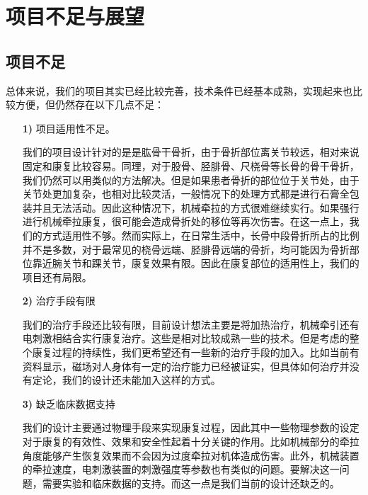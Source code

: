 \documentclass[UTF8]{ctexart}
\begin{document}
\section{项目不足与展望}
    \subsection{项目不足}
        总体来说，我们的项目其实已经比较完善，技术条件已经基本成熟，实现起来也比较方便，但仍然存在以下几点不足：
        \begin{enumerate}
            \item [\textbf{1)}]项目适用性不足。
            
            我们的项目设计针对的是是肱骨干骨折，由于骨折部位离关节较远，相对来说固定和康复比较容易。同理，对于股骨、胫腓骨、尺桡骨等长骨的骨干骨折，我们仍然可以用类似的方法解决。但是如果患者骨折的部位位于关节处，由于关节处更加复杂，也相对比较灵活，一般情况下的处理方式都是进行石膏全包装并且无法活动。因此这种情况下，机械牵拉的方式很难继续实行。如果强行进行机械牵拉康复，很可能会造成骨折处的移位等再次伤害。在这一点上，我们的方式适用性不够。然而实际上，在日常生活中，长骨中段骨折所占的比例并不是多数，对于最常见的桡骨远端、胫腓骨远端的骨折，均可能因为骨折部位靠近腕关节和踝关节，康复效果有限。因此在康复部位的适用性上，我们的项目还有局限。

            \item [\textbf{2)}]治疗手段有限
            
            我们的治疗手段还比较有限，目前设计想法主要是将加热治疗，机械牵引还有电刺激相结合实行康复治疗。这些是相对比较成熟一些的技术。但是考虑的整个康复过程的持续性，我们更希望还有一些新的治疗手段的加入。比如当前有资料显示，磁场对人身体有一定的治疗能力已经被证实，但具体如何治疗并没有定论，我们的设计还未能加入这样的方式。

            \item [\textbf{3)}]缺乏临床数据支持
            
            我们的设计主要通过物理手段来实现康复过程，因此其中一些物理参数的设定对于康复的有效性、效果和安全性起着十分关键的作用。比如机械部分的牵拉角度能够产生恢复效果而不会因为过度牵拉对机体造成伤害。此外，机械装置的牵拉速度，电刺激装置的刺激强度等参数也有类似的问题。要解决这一问题，需要实验和临床数据的支持。而这一点是我们当前的设计还缺乏的。
        \end{enumerate}
\end{document}
